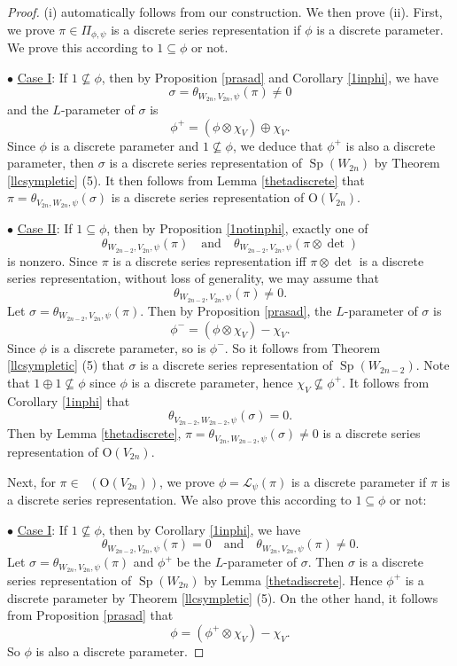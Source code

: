 \documentclass[article]{article}
\numberwithin{equation}{section}
\theoremstyle{definition}
\DeclareMathOperator{\SP}{Sp}
\DeclareMathOperator{\Irrt}{Irr_{temp}}
\begin{document}
\begin{proof}
	(i) automatically follows from our construction. We then prove (ii). First, we prove $\pi\in \Pi_{\phi,\psi}$ is a discrete series representation if $\phi$ is a discrete parameter. We prove this according to  $\mathrm 1\subseteq \phi$ or not.  

$\bullet$ \underline{Case I}: If $\mathrm 1\nsubseteq \phi$, then by Proposition \ref{prasad} and Corollary \ref{1inphi}, we have  $$\sigma=\theta_{W_{2n},V_{2n},\psi}(\pi)\neq 0$$ 
and the $L$-parameter of $\sigma$ is $$\phi^+=(\phi\otimes\chi_{V})\oplus\chi_{V}.$$
Since $\phi$ is a discrete parameter and $1\nsubseteq \phi$, we deduce that $\phi^+$ is also a discrete parameter, then $\sigma$ is a discrete series representation of $\SP(W_{2n})$ by Theorem \ref{llcsympletic} (5). It then follows from Lemma \ref{thetadiscrete} that  $\pi=\theta_{V_{2n},W_{2n},\psi}(\sigma)$ is a discrete series representation of $\mathrm O(V_{2n})$. 
	
$\bullet$ \underline{Case II}: If $\mathrm 1\subseteq \phi$, then by Proposition \ref{1notinphi}, exactly one of 
	$$\theta_{W_{2n-2},V_{2n},\psi}(\pi) \quad \mbox{and}\quad \theta_{W_{2n-2},V_{2n},\psi}(\pi\otimes\det)$$
is nonzero. Since $\pi$ is a discrete series representation iff $\pi\otimes\det$ is a discrete series representation, without loss of generality, we may assume that  $$\theta_{W_{2n-2},V_{2n},\psi}(\pi)\neq 0 .$$ 
Let $\sigma=\theta_{W_{2n-2},V_{2n},\psi}(\pi)$. Then by Proposition \ref{prasad}, the $L$-parameter of $\sigma$ is 
$$\phi^-=(\phi\otimes\chi_{V})-\chi_{V}.$$
Since $\phi$ is a discrete parameter, so is $\phi^-$. So it follows from Theorem \ref{llcsympletic} (5) that $\sigma$ is a discrete series representation of $\SP(W_{2n-2})$. Note that $\mathrm{1}\oplus \mathrm{1} \nsubseteq \phi$ since $\phi$ is a discrete parameter, hence $\chi_{V}\nsubseteq \phi^+$. It follows from Corollary \ref{1inphi} that $$\theta_{V_{2n-2},W_{2n-2},\psi} (\sigma)=0.$$
Then by Lemma \ref{thetadiscrete}, $\pi=\theta_{V_{2n},W_{2n-2},\psi}(\sigma)\neq 0$ is a discrete series representation of $\mathrm O(V_{2n})$. 

Next, for $\pi\in \Irrt(\mathrm O(V_{2n}))$, we prove $\phi=\mathcal L_\psi(\pi)$ is a discrete parameter if $\pi$ is a discrete series representation. We also prove this according to $\mathrm 1\subseteq \phi$ or not: 
	
$\bullet$ \underline{Case I}: If $\mathrm 1\nsubseteq \phi$, then by Corollary \ref{1inphi}, we have 
$$\theta_{W_{2n-2},V_{2n},\psi} (\pi)=0\quad \mbox{and}\quad \theta_{W_{2n},V_{2n},\psi}(\pi)\neq 0.$$
Let $\sigma=\theta_{W_{2n},V_{2n},\psi}(\pi)$ and $\phi^+$ be the $L$-parameter of $\sigma$. Then $\sigma$ is a discrete series representation of $\SP(W_{2n})$ by Lemma \ref{thetadiscrete}. Hence $\phi^+$ is a discrete parameter by Theorem \ref{llcsympletic} (5). On the other hand, it follows from Proposition \ref{prasad} that 
$$\phi=(\phi^+\otimes\chi_{V})-\chi_{V}.$$
So $\phi$ is also a discrete parameter. 
	

\end{proof}
\end{document}
